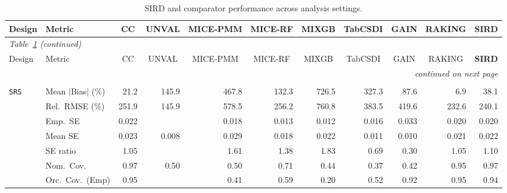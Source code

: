 \begin{landscape}
\footnotesize\setlength{\tabcolsep}{3.5pt}
\begin{longtable}{llrrrrrrrrr}
\caption{SIRD and comparator performance across analysis settings.}
\label{tab:appc_vccc_LOGISTIC} \\
\toprule
Design & Metric & \multicolumn{1}{c}{CC} & \multicolumn{1}{c}{UNVAL} & \multicolumn{1}{c}{MICE-PMM} & \multicolumn{1}{c}{MICE-RF} & \multicolumn{1}{c}{MIXGB} & \multicolumn{1}{c}{TabCSDI} & \multicolumn{1}{c}{GAIN} & \multicolumn{1}{c}{RAKING} & \multicolumn{1}{c}{\textbf{SIRD}} \\
\midrule \endfirsthead
\multicolumn{11}{l}{\footnotesize\itshape Table~\ref{tab:appc_vccc_LOGISTIC} (continued)} \\
\toprule
Design & Metric & \multicolumn{1}{c}{CC} & \multicolumn{1}{c}{UNVAL} & \multicolumn{1}{c}{MICE-PMM} & \multicolumn{1}{c}{MICE-RF} & \multicolumn{1}{c}{MIXGB} & \multicolumn{1}{c}{TabCSDI} & \multicolumn{1}{c}{GAIN} & \multicolumn{1}{c}{RAKING} & \multicolumn{1}{c}{\textbf{SIRD}} \\
\midrule \endhead
\midrule \multicolumn{11}{r}{\footnotesize\itshape continued on next page} \\
\endfoot
\bottomrule \endlastfoot
\multicolumn{11}{l}{\textbf{Continuous Phase-Two Covariates}} \\
\addlinespace[2pt]
\quad \texttt{SRS} & Mean $|$Bias$|$ (\%) & \cellcolor{ranktwo}21.2 & 145.9 & 467.8 & 132.3 & 726.5 & 327.3 & 87.6 & \cellcolor{rankone}6.9 & \cellcolor{rankthree}38.1 \\
 & Rel.\ RMSE (\%) & 251.9 & \cellcolor{rankone}145.9 & 578.5 & 256.2 & 760.8 & 383.5 & 419.6 & \cellcolor{ranktwo}232.6 & \cellcolor{rankthree}240.1 \\
 & Emp.\ SE & 0.022 &  & 0.018 & 0.013 & 0.012 & 0.016 & 0.033 & 0.020 & 0.020 \\
 & Mean SE & 0.023 & 0.008 & 0.029 & 0.018 & 0.022 & 0.011 & 0.010 & 0.021 & 0.022 \\
 & SE ratio & \cellcolor{rankone}1.05 &  & 1.61 & 1.38 & 1.83 & \cellcolor{rankthree}0.69 & 0.30 & \cellcolor{rankone}1.05 & \cellcolor{ranktwo}1.10 \\
 & Nom.\ Cov. & \cellcolor{ranktwo}0.97 & 0.50 & 0.50 & \cellcolor{rankthree}0.71 & 0.44 & 0.37 & 0.42 & \cellcolor{rankone}0.95 & \cellcolor{ranktwo}0.97 \\
 & Orc.\ Cov.\ (Emp) & \cellcolor{rankone}0.95 &  & 0.41 & 0.59 & 0.20 & 0.52 & \cellcolor{rankthree}0.92 & \cellcolor{rankone}0.95 & \cellcolor{ranktwo}0.94 \\

\end{longtable}
\end{landscape}
